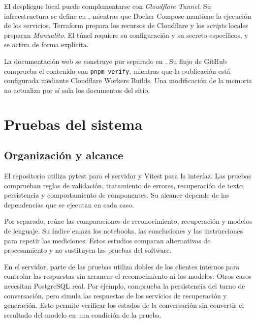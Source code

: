 El despliegue local puede complementarse con \textit{Cloudflare Tunnel}. Su infraestructura se define en , mientras que Docker Compose mantiene la ejecución de los servicios. Terraform prepara los recursos de Cloudflare y los \textit{scripts} locales preparan \textit{Manualito}. El túnel requiere su configuración y su secreto específicos, y se activa de forma explícita.

La documentación web se construye por separado en . Su flujo de GitHub comprueba el contenido con \texttt{pnpm verify}, mientras que la publicación está configurada mediante Cloudflare Workers Builds. Una modificación de la memoria no actualiza por sí sola los documentos del sitio.

\FloatBarrier
\section{Pruebas del sistema}
\label{sec:d-pruebas}

\subsection{Organización y alcance}

El repositorio utiliza pytest para el servidor y Vitest para la interfaz. Las pruebas comprueban reglas de validación, tratamiento de errores, recuperación de texto, persistencia y comportamiento de componentes. Su alcance depende de las dependencias que se ejecutan en cada caso.

Por separado,  reúne las comparaciones de reconocimiento,
recuperación y modelos de lenguaje. Su índice enlaza los notebooks, las
conclusiones y las instrucciones para repetir las mediciones. Estos estudios
comparan alternativas de procesamiento y no sustituyen las pruebas del software.

En el servidor, parte de las pruebas utiliza dobles de los clientes internos para controlar las respuestas sin arrancar el reconocimiento ni los modelos. Otros casos necesitan PostgreSQL real. Por ejemplo,  comprueba la persistencia del turno de conversación, pero simula las respuestas de los servicios de recuperación y generación. Esto permite verificar los estados de la conversación sin convertir el resultado del modelo en una condición de la prueba.

